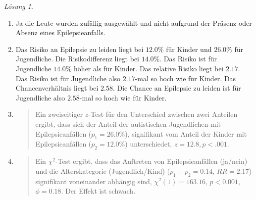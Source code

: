 \documentclass[
]{book}
\theoremstyle{definition}
\theoremstyle{definition}
\theoremstyle{definition}
\theoremstyle{definition}
\theoremstyle{remark}
\newtheorem*{solution}{Lösung}
\begin{document}
\begin{solution}
\begin{enumerate}
\def\labelenumi{\alph{enumi})}
\item
  Ja die Leute wurden zufällig ausgewählt und nicht aufgrund der Präsenz oder Absenz eines Epilepsieanfalls.
\item
  Das Risiko an Epilepsie zu leiden liegt bei \(12.0\%\) für Kinder und \(26.0\%\) für Jugendliche. Die Risikodifferenz liegt bei \(14.0\%\). Das Risiko ist für Jugendliche \(14.0\%\) höher als für Kinder. Das relative Risiko liegt bei \(2.17\). Das Risiko ist für Jugendliche also \(2.17\)-mal so hoch wie für Kinder. Das Chancenverhältnis liegt bei \(2.58\). Die Chance an Epilepsie zu leiden ist für Jugendliche also \(2.58\)-mal so hoch wie für Kinder.
\item
  \begin{quote}
  Ein zweiseitiger \(z\)-Test für den Unterschied zwischen zwei Anteilen ergibt, dass sich der Anteil der autistischen Jugendlichen mit Epilepsieanfällen (\(p_1 = 26.0\%\)), signifikant vom Anteil der Kinder mit Epilepsieanfällen (\(p_2 = 12.0\%\)) unterschiedet, \(z = 12.8, p < .001\).
  \end{quote}
\item
  \begin{quote}
  Ein \(\chi^2\)-Test ergibt, dass das Auftreten von Epilepsieanfällen (ja/nein) und die Alterskategorie (Jugendlich/Kind) (\(p_1-p_2= 0.14\), \(RR = 2.17\)) signifikant voneinander abhängig sind, \(\chi^2 (1) = 163.16\), \(p < 0.001\), \(\phi = 0.18.\) Der Effekt ist schwach.
  \end{quote}
\end{enumerate}

\end{solution}
\end{document}
